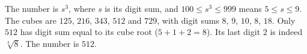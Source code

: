 The number is $s^3$, where $s$ is its digit sum, and $100\le s^3\le999$ means $5\le s\le9$. The cubes are $125$, $216$, $343$, $512$ and $729$, with digit sums $8$, $9$, $10$, $8$, $18$. Only $512$ has digit sum equal to its cube root ($5+1+2=8$). Its last digit $2$ is indeed $\sqrt[3]8$. The number is $\boxed{512}$.
